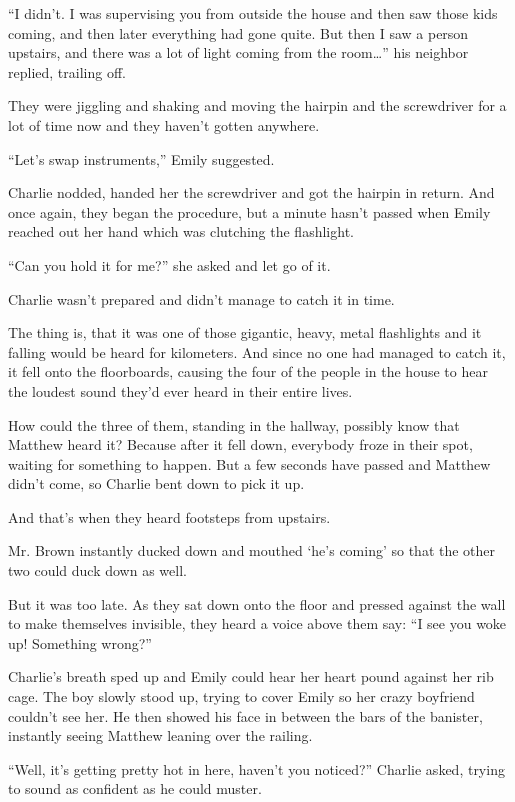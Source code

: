 “I didn't. I was supervising you from outside the house and then saw those kids coming, and then later everything had gone quite. But then I saw a person upstairs, and there was a lot of light coming from the room…” his neighbor replied, trailing off.

They were jiggling and shaking and moving the hairpin and the screwdriver for a lot of time now and they haven't gotten anywhere.

“Let's swap instruments,” Emily suggested.

Charlie nodded, handed her the screwdriver and got the hairpin in return. And once again, they began the procedure, but a minute hasn't passed when Emily reached out her hand which was clutching the flashlight.

“Can you hold it for me?” she asked and let go of it.

Charlie wasn't prepared and didn't manage to catch it in time.

The thing is, that it was one of those gigantic, heavy, metal flashlights and it falling would be heard for kilometers. And since no one had managed to catch it, it fell onto the floorboards, causing the four of the people in the house to hear the loudest sound they'd ever heard in their entire lives.

How could the three of them, standing in the hallway, possibly know that Matthew heard it? Because after it fell down, everybody froze in their spot, waiting for something to happen. But a few seconds have passed and Matthew didn't come, so Charlie bent down to pick it up.

And that's when they heard footsteps from upstairs.

Mr. Brown instantly ducked down and mouthed ‘he's coming' so that the other two could duck down as well.

But it was too late. As they sat down onto the floor and pressed against the wall to make themselves invisible, they heard a voice above them say:
“I see you woke up! Something wrong?”

Charlie's breath sped up and Emily could hear her heart pound against her rib cage. The boy slowly stood up, trying to cover Emily so her crazy boyfriend couldn't see her. He then showed his face in between the bars of the banister, instantly seeing Matthew leaning over the railing.

“Well, it's getting pretty hot in here, haven't you noticed?” Charlie asked, trying to sound as confident as he could muster.

